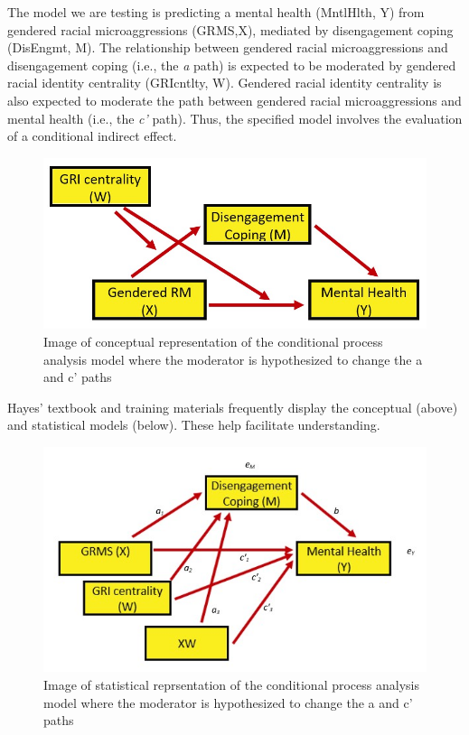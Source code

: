 \documentclass[
  11pt,
]{book}
\begin{document}
The model we are testing is predicting a mental health (MntlHlth, Y) from gendered racial microaggressions (GRMS,X), mediated by disengagement coping (DisEngmt, M). The relationship between gendered racial microaggressions and disengagement coping (i.e., the \emph{a} path) is expected to be moderated by gendered racial identity centrality (GRIcntlty, W). Gendered racial identity centrality is also expected to moderate the path between gendered racial microaggressions and mental health (i.e., the \emph{c'} path). Thus, the specified model involves the evaluation of a conditional indirect effect.

\begin{figure}
\centering
\includegraphics{images/ModMed/LewisModMed.jpg}
\caption{Image of conceptual representation of the conditional process analysis model where the moderator is hypothesized to change the a and c' paths}
\end{figure}

Hayes' \citeyearpar{hayes_introduction_2018} textbook and training materials frequently display the conceptual (above) and statistical models (below). These help facilitate understanding.

\begin{figure}
\centering
\includegraphics{images/ModMed/LewisStatistical.jpg}
\caption{Image of statistical reprsentation of the conditional process analysis model where the moderator is hypothesized to change the a and c' paths}
\end{figure}
\end{document}
